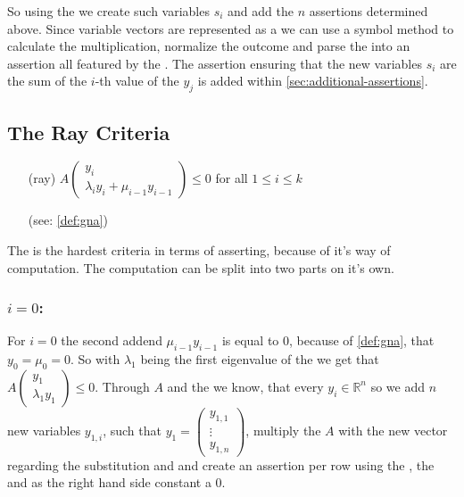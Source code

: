 So using the \smtfactory we create such variables $s_i$ and add the $n$ assertions determined above.\newline
Since variable vectors are represented as a \rpntree we can use a symbol method to calculate the multiplication, normalize the outcome and parse the \rpntree into an assertion all featured by the \smtfactory. \newline
The assertion ensuring that the new variables $s_i$ are the sum of the $i$-th value of the $y_j$ is added within \autoref{sec:additional-assertions}.


\subsection{The Ray Criteria}
\label{sec:ray-criteria}
\begin{itemize}
	\setlength{\itemindent}{1in}
	\item[(ray)] $A\begin{pmatrix} y_i \\ \lambda_i y_i + \mu_{i-1} y_{i-1} \end{pmatrix} \le 0$ for all $1 \le i \le k$
	\item[] (see: \autoref{def:gna})
\end{itemize}
The \rayc is the hardest criteria in terms of asserting, because of it's way of computation. \newline
The computation can be split into two parts on it's own.
\subsubsection{$i=0$:}
For $i=0$ the second addend $\mu_{i-1}y_{i-1}$ is equal to $0$, because of \autoref{def:gna}, that $y_0 = \mu_0 = 0$. So with $\lambda_1$ being the first eigenvalue of the \updatematrix we get that $A\begin{pmatrix} y_1 \\ \lambda_1 y_1 \end{pmatrix} \le 0$. \newline
Through $A$ and the \domc we know, that every $y_i\in \mathbb{R}^n$ so we add $n$ new variables $y_{1,i}$, such that $y_1 = \begin{pmatrix} y_{1,1} \\ \vdots \\ y_{1,n}\end{pmatrix}$, multiply the \updatematrix $A$ with the new vector regarding the substitution and and create an assertion per row using the \smtfactory, the   and as the right hand side constant a 0.

